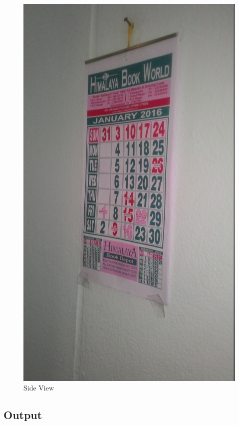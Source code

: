 \documentclass[12pt]{article}
\begin{document}
\begin{figure}[h]
\begin{minipage}{.5\textwidth}
\includegraphics[scale = 0.07]{cal2.jpg}
\caption{Side View}
\label{fig:Image 2}
\end{minipage}%
\end{figure}

\subsection{Output}
\end{document}
